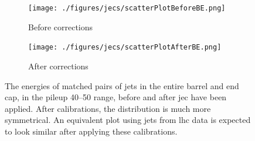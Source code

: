 \begin{figure}[htbp]
    \centering
    \begin{subfigure}[b]{0.45\textwidth}
        \texttt{[image: ./figures/jecs/scatterPlotBeforeBE.png]}
        \caption{Before corrections}
        \label{fig:detector_jecs_scatter_before_BE}
    \end{subfigure}
    \hfill
    \begin{subfigure}[b]{0.45\textwidth}
        \texttt{[image: ./figures/jecs/scatterPlotAfterBE.png]}
        \caption{After corrections}
        \label{fig:detector_jecs_scatter_after_BE}
    \end{subfigure}
\caption[The energies of matched pairs of jets in the entire barrel and end cap, in the pileup 40--50 range, before and after jet energy corrections have been applied]{The energies of matched pairs of jets in the entire barrel and end cap, in the pileup 40--50 range, before and after \acrlong{jec} have been applied. After calibrations, the distribution is much more symmetrical. An equivalent plot using \glspl{jet} from \acrshort{lhc} data is expected to look similar after applying these calibrations.}
\label{fig:detector_jecs_scatter_BE}
\end{figure}

